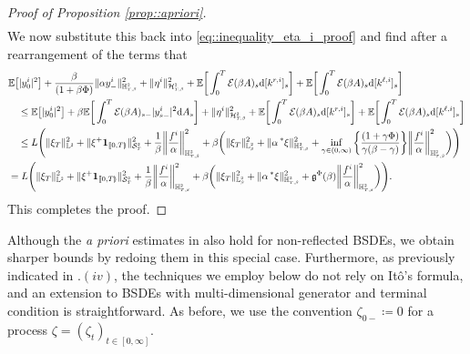 \documentclass[10pt]{article} %
\newcommand\cE{\mathcal E}
\newcommand\cH{\mathcal H}
\newcommand\cS{\mathcal S}
\newcommand{\smalltext}[1]{\text{\fontsize{4}{4}\selectfont$#1$}}
\newcommand\fg{\mathfrak g}
\def \E{\mathbb{E}}
\def \H{\mathbb{H}}
\def \L{\mathbb{L}}
\newcommand{\brs}[1]{\prescript{\ast}{}{#1}}
\newcommand{\1}{\mathbf{1}}
\def\d{\mathrm{d}}
\begin{document}
\begin{proof}[Proof of Proposition \ref{prop::apriori}]
\begin{align*}
\end{align*}
We now substitute this back into \eqref{eq::inequality_eta_i_proof} and find after a rearrangement of the terms that
\begin{align*}
	&\E\big[|y^i_0|^2\big] + \frac{\beta}{(1+\beta\Phi)}\|\alpha y^i_{-}\|^2_{\H^\smalltext{2}_{\smalltext{T}\smalltext{,}\smalltext{\beta}}} + \|\eta^i\|^2_{\cH^\smalltext{2}_{\smalltext{T}\smalltext{,}\smalltext{\beta}}} + \E\bigg[\int_0^T \cE(\beta A)_s \d[k^{r,i}]_s\bigg] + \E\bigg[\int_0^T \cE(\beta A)_s \d[k^{\ell,i}]_s\bigg] \\
	&\quad\leq \E\big[|y^i_0|^2\big] + \beta\E\bigg[\int_0^T\cE(\beta A)_{s-}|y^i_{s-}|^2 \d A_s\bigg] + \|\eta^i\|^2_{\cH^\smalltext{2}_{\smalltext{T}\smalltext{,}\smalltext{\beta}}} + \E\bigg[\int_0^T \cE(\beta A)_s \d[k^{r,i}]_s\bigg] + \E\bigg[\int_0^T \cE(\beta A)_s \d[k^{\ell,i}]_s\bigg] \\
	&\quad\leq L\Bigg( \|\xi_T\|^2_{\L^\smalltext{2}} + \|\xi^+\1_{\llbracket 0,T\rrparenthesis}\|^2_{\cS^\smalltext{2}_\smalltext{T}} + \frac{1}{\beta} \bigg\|\frac{f^i}{\alpha}\bigg\|^2_{\H^\smalltext{2}_{\smalltext{T}\smalltext{,}\smalltext{\beta}}} + \beta\bigg(\|\xi_T\|^2_{\L^\smalltext{2}_\smalltext{\beta}} + \| \alpha\brs{\xi}\|^2_{\H^\smalltext{2}_{\smalltext{T}\smalltext{,}\smalltext{\beta}}} + \inf_{\gamma \in (0,\infty)} \bigg\{\frac{(1+\gamma\Phi)}{\gamma(\beta-\gamma)}\bigg\} \bigg\|\frac{f^i}{\alpha}\bigg\|^2_{\H^\smalltext{2}_{\smalltext{T}\smalltext{,}\smalltext{\beta}}}\bigg)\Bigg) \\
	&= L\Bigg( \|\xi_T\|^2_{\L^\smalltext{2}} + \|\xi^+\1_{\llbracket 0,T\rrparenthesis}\|^2_{\cS^\smalltext{2}_\smalltext{T}} + \frac{1}{\beta} \bigg\|\frac{f^i}{\alpha}\bigg\|^2_{\H^\smalltext{2}_{\smalltext{T}\smalltext{,}\smalltext{\beta}}} + \beta\bigg(\|\xi_T\|^2_{\L^\smalltext{2}_\smalltext{\beta}} + \| \alpha\brs{\xi}\|^2_{\H^\smalltext{2}_{\smalltext{T}\smalltext{,}\smalltext{\beta}}} + \fg^\Phi(\beta) \bigg\|\frac{f^i}{\alpha}\bigg\|^2_{\H^\smalltext{2}_{\smalltext{T}\smalltext{,}\smalltext{\beta}}}\bigg)\Bigg).
\end{align*}
This completes the proof.
\end{proof}

Although the \emph{a priori} estimates in  also hold for non-reflected BSDEs, we obtain sharper bounds by redoing them in this special case. Furthermore, as previously indicated in .$(iv)$, the techniques we employ below do not rely on It\^o's formula, and an extension to BSDEs with multi-dimensional generator and terminal condition is straightforward. As before, we use the convention $\zeta_{0-} \coloneqq 0$ for a process $\zeta =(\zeta_t)_{t \in [0,\infty]}$.
\end{document}
